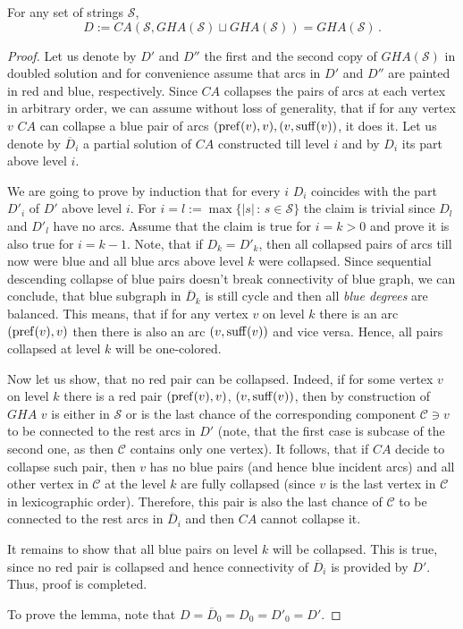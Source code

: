 \begin{theorem}
For any set of strings $\mathcal{S}$,
\[
			D := CA(\mathcal{S}, GHA(\mathcal{S}) \sqcup GHA(\mathcal{S})) = GHA(\mathcal{S}) \, .
\]
\end{theorem}
\begin{proof}
 Let us denote by $D'$ and $D''$ the first and the second copy of $GHA(\mathcal{S})$ in doubled solution and for convenience assume that arcs in $D'$ and $D''$ are painted in red and blue, respectively. Since $CA$ collapses the pairs of arcs at each vertex in arbitrary order, we can assume without loss of generality, that if for any vertex $v$ $CA$ can collapse a blue pair of arcs $(\operatorname{pref}(v), v), (v, \operatorname{suff}(v))$, it does it. Let us denote by $\overline{D}_i$ a partial solution of $CA$ constructed till level $i$ and by $D_i$ its part above level $i$. 	
	
	We are going to prove by induction that for every $i$ $D_i$ coincides with the part $D'_i$ of $D'$ above level $i$. For $i = l := \max\{|s| \, : \, s\in\mathcal{S}\}$ the claim is trivial since $D_l$ and $D'_l$ have no arcs. Assume that the claim is true for $i = k > 0$ and prove it is also true for $i = k - 1$. Note, that if $D_k = D'_k$, then all collapsed pairs of arcs till now were blue and all blue arcs above level $k$ were collapsed. Since sequential descending collapse of blue pairs doesn't break connectivity of blue graph, we can conclude, that blue subgraph in $\overline{D}_k$ is still cycle and then all {\em blue degrees} are balanced. This means, that if for any vertex $v$ on level $k$ there is an arc $(\operatorname{pref}(v), v)$ then there is also an arc $(v, \operatorname{suff}(v))$ and vice versa. Hence, all pairs collapsed at level $k$ will be one-colored.
	
	Now let us show, that no red pair can be collapsed. Indeed, if for some vertex $v$ on level $k$ there is a red pair $(\operatorname{pref}(v), v)$, $(v, \operatorname{suff}(v))$, then by construction of $GHA$ $v$ is either in $\mathcal{S}$ or is the last chance of the corresponding component $\mathcal{C} \ni v$ to be connected to the rest arcs in $D'$ (note, that the first case is subcase of the second one, as then $\mathcal{C}$ contains only one vertex). It follows, that if $CA$ decide to collapse such pair, then $v$ has no blue pairs (and hence blue incident arcs) and all other vertex in $\mathcal{C}$ at the level $k$ are fully collapsed (since $v$ is the last vertex in $\mathcal{C}$ in lexicographic order). Therefore, this pair is also the last chance of $\mathcal{C}$ to be connected to the rest arcs in $\overline{D}_i$ and then $CA$ cannot collapse it.
	
	It remains to show that all blue pairs on level $k$ will be collapsed. This is true, since no red pair is collapsed and hence connectivity of $\overline{D}_i$ is provided by $D'$. Thus, proof is completed.
	
	To prove the lemma, note that $D = \overline{D}_0 = D_0 = D'_0 = D'$.
\end{proof}


